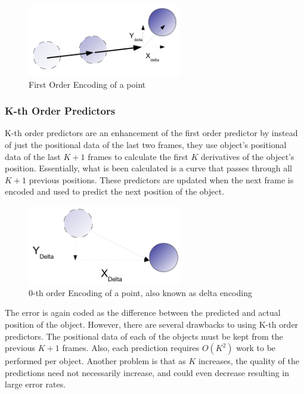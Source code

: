 \documentclass[a4paper,11pt]{report}
\begin{document}
\begin{figure}[h]
 \center
 \includegraphics[width=0.6\textwidth]{resources/FirstOrderEncoding.png}
\caption{First Order Encoding of a point}
\label{linearencoding}
\end{figure}

\subsubsection{K-th Order Predictors}

K-th order predictors are an enhancement of the first order predictor by instead of just the positional data of the last two frames, they use object's positional data of the last $K+1$ frames to calculate the first $K$ derivatives of the object's position. Essentially, what is been calculated is a curve that passes through all $K+1$ previous positions. These predictors are updated when the next frame is encoded and used to predict the next position of the object.

\begin{figure}[h]
 \center
 \includegraphics[width=0.6\textwidth]{resources/DeltaEncoding.png}
\caption{0-th order Encoding of a point, also known as delta encoding}
\label{deltaencoding}
\end{figure}

The error is again coded as the difference between the predicted and actual position of the object. However, there are several drawbacks to using K-th order predictors. The positional data of each of the objects must be kept from the previous $K+1$ frames. Also, each prediction requires $O(K^2)$ work to be performed per object. Another problem is that as $K$ increases, the quality of the predictions need not necessarily increase, and could even decrease resulting in large error rates.
\end{document}
